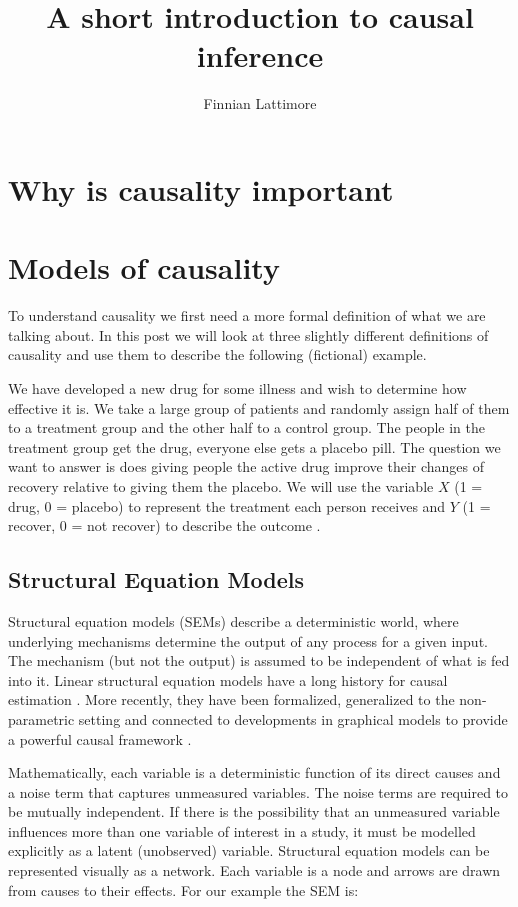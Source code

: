 \documentclass[11pt,a4paper]{article}
\author{Finnian Lattimore}
\title{A short introduction to causal inference}
\begin{document}
\section{Why is causality important}

\section{Models of causality}
To understand causality we first need a more formal definition of what we are talking about. In this post we will look at three slightly different definitions of causality and use them to describe the following (fictional) example.

We have developed a new drug for some illness and wish to determine how effective it is. We take a large group of patients and randomly assign half of them to a treatment group and the other half to a control group. The people in the treatment group get the drug, everyone else gets a placebo pill. The question we want to answer is does giving people the active drug improve their changes of recovery relative to giving them the placebo. We will use the variable $X$ (1 = drug, 0 = placebo) to represent the treatment each person receives and $Y$ (1 = recover, 0 = not recover) to describe the outcome .
\subsection{Structural Equation Models}

Structural equation models (SEMs) describe a deterministic world, where underlying mechanisms determine the output of any process for a given input. The mechanism (but not the output) is assumed to be independent of what is fed into it. Linear structural equation models have a long history for causal estimation \cite {Wright1921,Haavelmo1943}. More recently, they have been formalized, generalized to the non-parametric setting and connected to developments in graphical models to provide a powerful causal framework \cite{Pearl2000}.

Mathematically, each variable is a deterministic function of its direct causes and a noise term that captures unmeasured variables. The noise terms are required to be mutually independent. If there is the possibility that an unmeasured variable influences more than one variable of interest in a study, it must be modelled explicitly as a latent (unobserved) variable. Structural equation models can be represented visually as a network. Each variable is a node and arrows are drawn from causes to their effects. For our example the SEM is:
\end{document}
